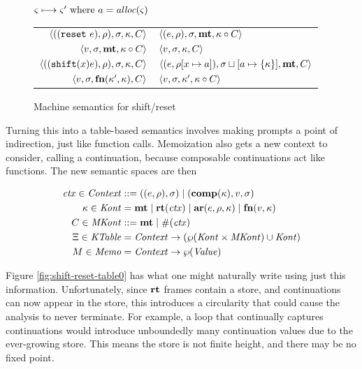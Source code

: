 \documentclass{llncs}
\begin{document}
\begin{figure}
  \centering
  $\varsigma \longmapsto \varsigma' \text{ where } a = \mathit{alloc}(\varsigma)$ \\
  \begin{tabular}{r|l}
    \hline
    $\langle ((\texttt{reset}\ e), \rho), \sigma, \kappa, C \rangle$
    &
    $\langle (e, \rho), \sigma, \mathbf{mt}, \kappa\circ C \rangle$
    \\
    $\langle v, \sigma, \mathbf{mt}, \kappa\circ C \rangle$
    &
    $\langle v, \sigma, {\kappa}, {C} \rangle$
    \\
    $\langle ((\texttt{shift} (x) e), \rho), \sigma, \kappa, C \rangle$
    &
    $\langle (e, \rho[x \mapsto a]), \sigma\sqcup[a \mapsto \{ \kappa \}],\mathbf{mt},C \rangle$
    \\
    $\langle v,\sigma,\mathbf{fn}{}(\kappa', \kappa), C \rangle$
    &
    $\langle v, \sigma, \kappa', \kappa\circ C \rangle$
  \end{tabular}  
  \caption{Machine semantics for shift/reset}
  \label{fig:shift-reset}
\end{figure}

Turning this into a table-based semantics involves making prompts a
point of indirection, just like function calls. Memoization also gets
a new context to consider, calling a continuation, because composable
continuations act like functions. The new semantic spaces are then

\begin{align*}
  \mathit{ctx} \in \mathit{Context} &::= ((e,\rho),\sigma) \mid (\mathbf{comp}(\kappa),v,\sigma) \\
  \kappa \in \mathit{Kont} &= \mathbf{mt} \mid \mathbf{rt}(\mathit{ctx}) \mid \mathbf{ar}{}(e,\rho,\kappa) \mid \mathbf{fn}{}(v,\kappa) \\
  C \in \mathit{MKont} &::= \mathbf{mt} \mid \#(\mathit{ctx}) \\
  \Xi \in \mathit{KTable} &= \mathit{Context} \to (\wp(\mathit{Kont} \times \mathit{MKont}) \cup \mathit{Kont}) \\
  M \in \mathit{Memo} &= \mathit{Context} \to \wp(\mathit{Value})
\end{align*}

Figure \ref{fig:shift-reset-table0} has what one might naturally write
using just this information. Unfortunately, since $\mathbf{rt}$ frames contain
a store, and continuations can now appear in the store, this
introduces a circularity that could cause the analysis to never
terminate. For example, a loop that continually captures continuations
would introduce unboundedly many continuation values due to the
ever-growing store. This means the store is not finite height, and
there may be no fixed point.
\end{document}
